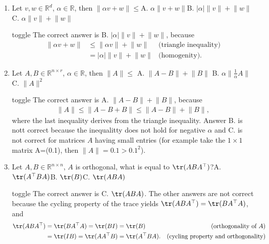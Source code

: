 \documentclass[letterpaper,10pt,english]{jupyterBook}
\begin{document}
\begin{enumerate}
\begin{sphinxuseclass}{toggle}
\end{sphinxuseclass}
\item {} 
\sphinxAtStartPar
Let \(v,w\in\mathbb{R}^{d}\), \(\alpha\in\mathbb{R}\), then \(\lVert\alpha v + w\rVert\leq\)A. \(\alpha\lVert v+w\rVert\)B. \(\lvert\alpha\rvert\lVert v\rVert+\lVert w\rVert\)C. \(\alpha\lVert v\rVert+\lVert w\rVert\)

\begin{sphinxuseclass}{toggle}
\sphinxAtStartPar
The correct answer is B. \(\lvert\alpha\rvert\lVert v\rVert+\lVert w\rVert\), because
\begin{align*}
\lVert\alpha v + w\rVert&\leq \lVert\alpha v\rVert + \lVert w\rVert  &\text{(triangle inequality)}\\
& = \lvert\alpha\rvert\lVert v\rVert + \lVert w\rVert  &\text{(homogenity)}.
\end{align*}
\end{sphinxuseclass}
\item {} 
\sphinxAtStartPar
Let \(A,B\in\mathbb{R}^{n\times r}\), \(\alpha\in\mathbb{R}\), then \(\lVert A\rVert\leq\)
A. \(\lVert A-B\rVert + \lVert B\rVert\)
B. \(\alpha\lVert\frac{1}{\alpha}A\rVert\)
C. \(\lVert A\rVert^2\)

\begin{sphinxuseclass}{toggle}
\sphinxAtStartPar
The correct answer is A. \(\lVert A-B\rVert + \lVert B\rVert\), because
\begin{align*}
\lVert A\rVert\leq \lVert A-B+B\rVert \leq \lVert A -B \rVert +\lVert B\rVert,
\end{align*}
\sphinxAtStartPar
where the last inequality derives from the triangle inequality. Answer B. is nott correct because the inequalitty does not hold for negative \(\alpha\) and C. is not correct for matrices \(A\) having small entries (for example take the \(1\times 1\) matrix A=(0.1), then \(\lVert A\rVert = 0.1 > 0.1^2\)).

\end{sphinxuseclass}
\item {} 
\sphinxAtStartPar
Let \(A,B\in\mathbb{R}^{n\times n}\), \(A\) is orthogonal, what is  equal to \(\tr(ABA^\top)\)?A. \(\tr(A^\top BA)\)B. \(\tr(B)\)C. \(\tr(ABA)\)

\begin{sphinxuseclass}{toggle}
\sphinxAtStartPar
The correct answer is C. \(\tr(ABA)\). The other answers are not correct because the cycling property of the trace yields \(\tr(ABA^\top)  = \tr(BA^\top A)\), and
\begin{align*}
\tr(ABA^\top) & = \tr(BA^\top A) = \tr(BI) =\tr(B) & \text{(orthogonality of $A$)}\\
& = \tr(IB) = \tr(AA^\top B) = \tr(A^\top B A). &\text{(cycling property and orthogonality)}
\end{align*}
\end{sphinxuseclass}
\end{enumerate}
\end{document}
